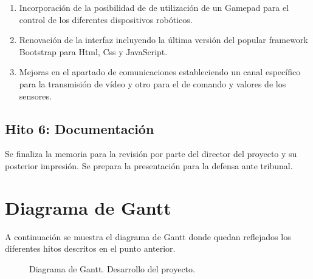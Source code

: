 \begin{enumerate}
 \item Incorporación de la posibilidad de de utilización de un Gamepad para el control de los diferentes dispositivos robóticos.
 \item Renovación de la interfaz incluyendo la última versión del popular framework Bootstrap para Html, Css y JavaScript.
 \item Mejoras en el apartado de comunicaciones estableciendo un canal específico para la transmisión de vídeo y otro para el de comando y valores de los sensores.
\end{enumerate}


\subsection{Hito 6: Documentación }
\label{subsec:hito6}

Se finaliza la memoria para la revisión por parte del director del proyecto y su posterior impresión. Se prepara la presentación para la defensa ante tribunal.

\section{Diagrama de Gantt}

A continuación se muestra el diagrama de Gantt donde quedan reflejados los diferentes hitos descritos en el punto anterior.

\begin{figure}
  \caption{Diagrama de Gantt. Desarrollo del proyecto.}
\end{figure}
